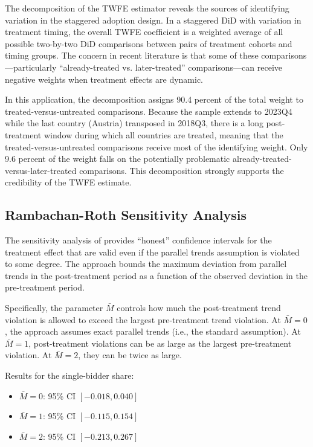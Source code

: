\documentclass[12pt]{article}
\begin{document}
The \citet{goodmanbacon2021} decomposition of the TWFE estimator reveals the sources of identifying variation in the staggered adoption design. In a staggered DiD with variation in treatment timing, the overall TWFE coefficient is a weighted average of all possible two-by-two DiD comparisons between pairs of treatment cohorts and timing groups. The concern in recent literature is that some of these comparisons---particularly ``already-treated vs. later-treated'' comparisons---can receive negative weights when treatment effects are dynamic.

In this application, the decomposition assigns 90.4 percent of the total weight to treated-versus-untreated comparisons. Because the sample extends to 2023Q4 while the last country (Austria) transposed in 2018Q3, there is a long post-treatment window during which all countries are treated, meaning that the treated-versus-untreated comparisons receive most of the identifying weight. Only 9.6 percent of the weight falls on the potentially problematic already-treated-versus-later-treated comparisons. This decomposition strongly supports the credibility of the TWFE estimate.

\subsection{Rambachan-Roth Sensitivity Analysis}

The sensitivity analysis of \citet{rambachanRoth2023} provides ``honest'' confidence intervals for the treatment effect that are valid even if the parallel trends assumption is violated to some degree. The approach bounds the maximum deviation from parallel trends in the post-treatment period as a function of the observed deviation in the pre-treatment period.

Specifically, the parameter $\bar{M}$ controls how much the post-treatment trend violation is allowed to exceed the largest pre-treatment trend violation. At $\bar{M} = 0$, the approach assumes exact parallel trends (i.e., the standard assumption). At $\bar{M} = 1$, post-treatment violations can be as large as the largest pre-treatment violation. At $\bar{M} = 2$, they can be twice as large.

Results for the single-bidder share:
\begin{itemize}
\item $\bar{M} = 0$: 95\% CI $[-0.018, 0.040]$
\item $\bar{M} = 1$: 95\% CI $[-0.115, 0.154]$
\item $\bar{M} = 2$: 95\% CI $[-0.213, 0.267]$
\end{itemize}
\end{document}
